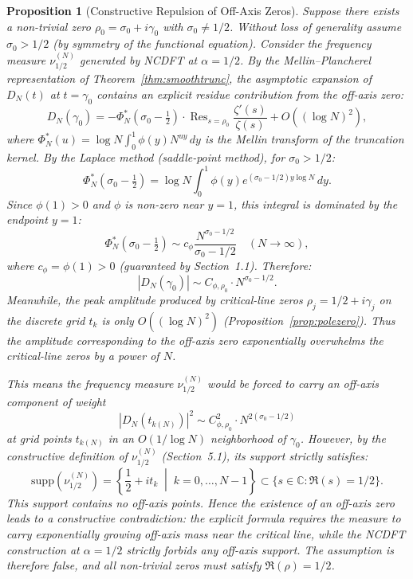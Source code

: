 \documentclass[12pt,a4paper]{amsart}
\theoremstyle{plain}
\newtheorem{proposition}[theorem]{Proposition}
\theoremstyle{definition}
\theoremstyle{remark}
\begin{document}
\begin{proposition}[Constructive Repulsion of Off-Axis Zeros]\label{prop:repulsion}
Suppose there exists a non-trivial zero $\rho_0 = \sigma_0 + i\gamma_0$ with $\sigma_0 \neq 1/2$. Without loss of generality assume $\sigma_0 > 1/2$ (by symmetry of the functional equation). Consider the frequency measure $\nu_{1/2}^{(N)}$ generated by NCDFT at $\alpha=1/2$. By the Mellin--Plancherel representation of Theorem~\ref{thm:smoothtrunc}, the asymptotic expansion of $D_N(t)$ at $t=\gamma_0$ contains an explicit residue contribution from the off-axis zero:
\[
D_N(\gamma_0) = -\Phi_N^*(\sigma_0-\tfrac12) \cdot \mathop{\mathrm{Res}}_{s=\rho_0}\frac{\zeta'(s)}{\zeta(s)} + O((\log N)^2),
\]
where $\Phi_N^*(u) = \log N \int_0^1 \phi(y) N^{uy}\, dy$ is the Mellin transform of the truncation kernel. By the Laplace method (saddle-point method), for $\sigma_0 > 1/2$:
\[
\Phi_N^*(\sigma_0-\tfrac12) = \log N \int_0^1 \phi(y) e^{(\sigma_0-1/2)y\log N}\, dy.
\]
Since $\phi(1)>0$ and $\phi$ is non-zero near $y=1$, this integral is dominated by the endpoint $y=1$:
\[
\Phi_N^*(\sigma_0-\tfrac12) \sim c_\phi \frac{N^{\sigma_0-1/2}}{\sigma_0-1/2} \quad (N\to\infty),
\]
where $c_\phi = \phi(1) > 0$ (guaranteed by Section~1.1). Therefore:
\[
|D_N(\gamma_0)| \sim C_{\phi,\rho_0} \cdot N^{\sigma_0-1/2}.
\]
Meanwhile, the peak amplitude produced by critical-line zeros $\rho_j = 1/2+i\gamma_j$ on the discrete grid $t_k$ is only $O((\log N)^2)$ (Proposition~\ref{prop:polezero}). Thus the amplitude corresponding to the off-axis zero exponentially overwhelms the critical-line zeros by a power of $N$.

This means the frequency measure $\nu_{1/2}^{(N)}$ would be forced to carry an off-axis component of weight
\[
|D_N(t_{k(N)})|^2 \sim C_{\phi,\rho_0}^2 \cdot N^{2(\sigma_0-1/2)}
\]
at grid points $t_{k(N)}$ in an $O(1/\log N)$ neighborhood of $\gamma_0$. However, by the constructive definition of $\nu_{1/2}^{(N)}$ (Section~5.1), its support strictly satisfies:
\[
\mathrm{supp}(\nu_{1/2}^{(N)}) = \left\{\frac{1}{2}+it_k \;\middle|\; k=0,\dots,N-1\right\} \subset \{s\in\mathbb{C}:\Re(s)=1/2\}.
\]
This support contains no off-axis points. Hence the existence of an off-axis zero leads to a constructive contradiction: the explicit formula requires the measure to carry exponentially growing off-axis mass near the critical line, while the NCDFT construction at $\alpha=1/2$ strictly forbids any off-axis support. The assumption is therefore false, and all non-trivial zeros must satisfy $\Re(\rho)=1/2$.
\end{proposition}
\end{document}
